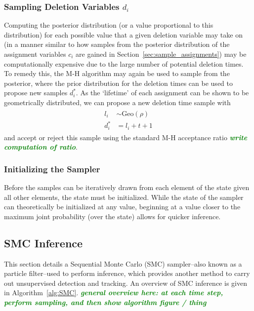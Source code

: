 \documentclass[smallcondensed, final]{svjour3}
\newcommand{\willie}[1]{\textcolor{green}{\textsf{\emph{\textbf{\textcolor{green}{#1}}}}}}
\begin{document}
\subsubsection{Sampling Deletion Variables $d_{i}$}
Computing the posterior distribution (or a value proportional to this distribution) for each possible value that a given deletion variable may take on (in a manner similar to how samples from the posterior distribution of the assignment variables $c_{i}$ are gained in Section~\ref{sec:sample_assignments}) may be computationally expensive due to the large number of potential deletion times. To remedy this, the M-H algorithm may again be used to sample from the posterior, where the prior distribution for the deletion times can be used to propose new samples $d_{i}^{*}$. As the `lifetime' of each assignment can be shown to be geometrically distributed, we can propose a new deletion time sample with
\begin{align}
\begin{split}
l_{i}  &\sim  \text{Geo}(\rho)  \\
d_{i}^{*}  &= l_{i} + t + 1
\end{split}
\end{align}
and accept or reject this sample using the standard M-H acceptance ratio \willie{write computation of ratio}.



\subsubsection{Initializing the Sampler}
Before the samples can be iteratively drawn from each element of the state given all other elements, the state must be initialized. While the state of the sampler can theoretically be initialized at any value, beginning at a value closer to the maximum joint probability (over the state) allows for quicker inference.



\subsection{SMC Inference}
\label{sec:SMC}

This section details a Sequential Monte Carlo (SMC) sampler--also known as a particle filter--used to perform inference, which provides another method to carry out unsupervised detection and tracking. An overview of SMC inference is given in Algorithm~\ref{alg:SMC}. \willie{general overview here: at each time step, perform sampling, and then show algorithm figure / thing}
\end{document}
